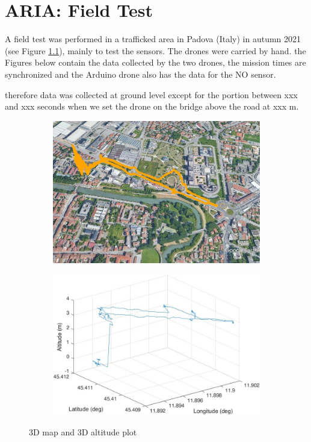 \chapter{ARIA: Field Test}
A field test was performed in a trafficked area in Padova (Italy) in autumn 2021 (see Figure \ref{fig:3d-map}), mainly to test the sensors. The drones were carried by hand. the Figures below contain the data collected by the two drones, the mission times are synchronized and the Arduino drone also has the data for the NO sensor.


therefore data was collected at ground level except for the portion between xxx and xxx seconds when we set the drone on the bridge above the road at xxx m.

\begin{figure}[h!]
    \centering
    \begin{subfigure}[b]{0.45\textwidth}
        \centering
        \includegraphics[width=\textwidth]{images/flight-data/3d-map.jpg}
        \caption{}
        \label{fig:3d-map}
    \end{subfigure}
    \hfill
    \begin{subfigure}[b]{0.45\textwidth}
        \centering
        \includegraphics[width=\textwidth]{images/flight-data/raspberry/ALT_3D_R.jpg}
        \caption{}
        \label{fig:testflight-alt}
    \end{subfigure}
       \caption{3D map and 3D altitude plot}
       \label{fig:testflight-telemetry}
\end{figure}

